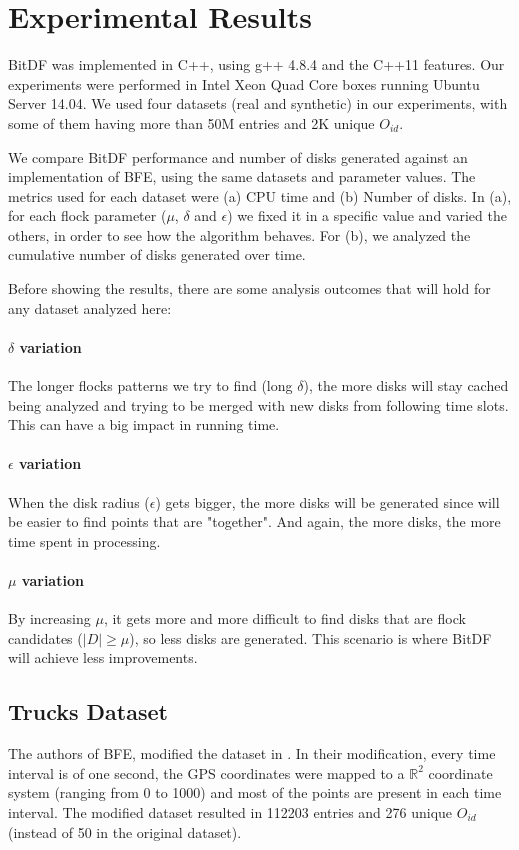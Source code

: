 \chapter{Experimental Results}
\label{chp:results}
BitDF was implemented in C++, using g++ 4.8.4 and the C++11 features. Our experiments were performed in Intel Xeon Quad
Core boxes running Ubuntu Server 14.04. We used four datasets (real and synthetic) in our experiments, with some of them
having more than 50M entries and 2K unique $O_{id}$.

We compare BitDF performance and number of disks generated against an implementation of BFE, using the same datasets
and parameter values. The metrics used for each dataset were (a) CPU time and (b) Number of disks. In (a), for each
flock parameter ($\mu$, $\delta$ and $\epsilon$) we fixed it in a specific value and varied the others, in order to see
how the algorithm behaves. For (b), we analyzed the cumulative number of disks generated over time.

Before showing the results, there are some analysis outcomes that will hold for any dataset analyzed here:

\subsubsection{$\delta$ variation}
\label{sssec:lvariation}
The longer flocks patterns we try to find (long $\delta$), the more disks will stay cached being analyzed and trying to
be merged with new disks from following time slots. This can have a big impact in running time.

\subsubsection{$\epsilon$ variation}
\label{sssec:gvariation}
When the disk radius ($\epsilon$) gets bigger, the more disks will be generated since will be easier to find points that
are "together". And again, the more disks, the more time spent in processing.

\subsubsection{$\mu$ variation}
\label{sssec:nvariation}
By increasing $\mu$, it gets more and more difficult to find disks that are flock candidates ($|D| \ge \mu$), so less
disks are generated. This scenario is where BitDF will achieve less improvements.

\section{Trucks Dataset}
\label{subsec:trucks}
The authors of BFE, modified the dataset in \citep{trucksdataset}. In their modification, every time interval is of
one second, the GPS coordinates were mapped to a $\mathbb{R}^2$ coordinate system (ranging from 0 to 1000) and most of
the points are present in each time interval. The modified dataset resulted in 112203 entries and 276 unique $O_{id}$
(instead of 50 in the original dataset).

